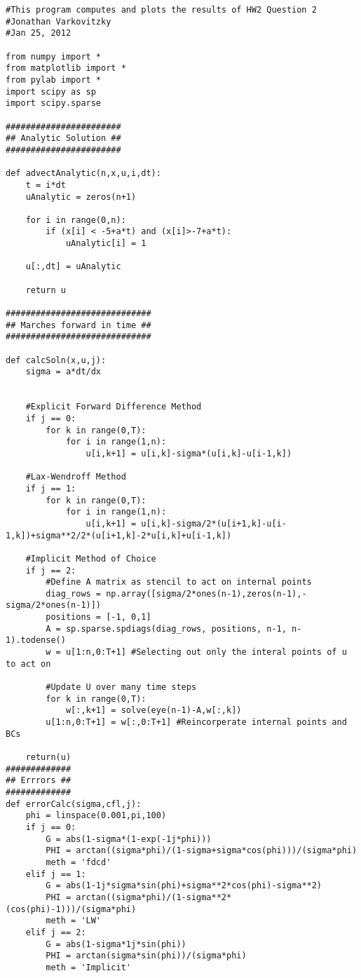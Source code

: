 \documentclass[a4paper,12pt,titlepage]{article}
\begin{document}
\begin{verbatim}
#This program computes and plots the results of HW2 Question 2
#Jonathan Varkovitzky
#Jan 25, 2012

from numpy import *
from matplotlib import *
from pylab import *
import scipy as sp
import scipy.sparse

#######################
## Analytic Solution ##
#######################

def advectAnalytic(n,x,u,i,dt):
    t = i*dt
    uAnalytic = zeros(n+1)

    for i in range(0,n):
        if (x[i] < -5+a*t) and (x[i]>-7+a*t):
            uAnalytic[i] = 1

    u[:,dt] = uAnalytic

    return u

#############################
## Marches forward in time ##
#############################

def calcSoln(x,u,j):
    sigma = a*dt/dx


    #Explicit Forward Difference Method
    if j == 0: 
        for k in range(0,T):
            for i in range(1,n):
                u[i,k+1] = u[i,k]-sigma*(u[i,k]-u[i-1,k])

    #Lax-Wendroff Method
    if j == 1:
        for k in range(0,T):
            for i in range(1,n):
                u[i,k+1] = u[i,k]-sigma/2*(u[i+1,k]-u[i-1,k])+sigma**2/2*(u[i+1,k]-2*u[i,k]+u[i-1,k])
        
    #Implicit Method of Choice
    if j == 2:
        #Define A matrix as stencil to act on internal points
        diag_rows = np.array([sigma/2*ones(n-1),zeros(n-1),-sigma/2*ones(n-1)])
        positions = [-1, 0,1]
        A = sp.sparse.spdiags(diag_rows, positions, n-1, n-1).todense()
        w = u[1:n,0:T+1] #Selecting out only the interal points of u to act on

        #Update U over many time steps
        for k in range(0,T):
            w[:,k+1] = solve(eye(n-1)-A,w[:,k])
        u[1:n,0:T+1] = w[:,0:T+1] #Reincorperate internal points and BCs

    return(u)
#############
## Errrors ##
#############
def errorCalc(sigma,cfl,j):
    phi = linspace(0.001,pi,100)
    if j == 0:
        G = abs(1-sigma*(1-exp(-1j*phi)))
        PHI = arctan((sigma*phi)/(1-sigma+sigma*cos(phi)))/(sigma*phi)
        meth = 'fdcd'
    elif j == 1:
        G = abs(1-1j*sigma*sin(phi)+sigma**2*cos(phi)-sigma**2)
        PHI = arctan((sigma*phi)/(1-sigma**2*(cos(phi)-1)))/(sigma*phi)
        meth = 'LW'
    elif j == 2:
        G = abs(1-sigma*1j*sin(phi))
        PHI = arctan(sigma*sin(phi))/(sigma*phi)
        meth = 'Implicit'


\end{verbatim}
\end{document}
